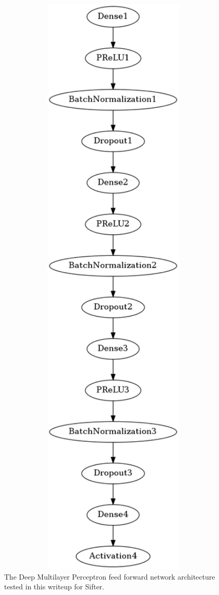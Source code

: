 \documentclass[12pt,twoside]{article}
\begin{document}
\begin{figure}[h]
\centering
\setlength{\abovecaptionskip}{-2.25in}
\includegraphics[angle=90,origin=c,width=1.0\textwidth]{figures/model.png}
\caption{The Deep Multilayer Perceptron feed forward network architecture tested in this writeup for Sifter.}
\label{fig:approach}
\end{figure}
\end{document}
